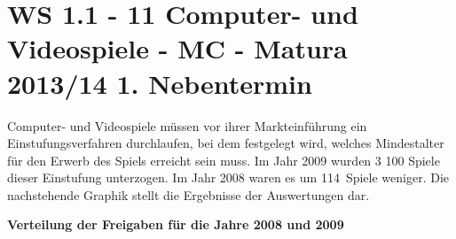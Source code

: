 \section{WS 1.1 - 11 Computer- und Videospiele - MC - Matura 2013/14 1. Nebentermin}

\begin{beispiel}[WS 1.1]{1} %
				Computer- und Videospiele müssen vor ihrer Markteinführung ein Einstufungsverfahren durchlaufen, bei dem festgelegt wird, welches Mindestalter für den Erwerb des Spiels erreicht sein muss. Im Jahr 2009 wurden 3 100 Spiele dieser Einstufung unterzogen. Im Jahr 2008 waren es um 114 Spiele weniger. Die nachstehende Graphik stellt die Ergebnisse der Auswertungen dar.
				
				\begin{center}
					\textbf{Verteilung der Freigaben für die Jahre 2008 und 2009}
					

\end{center}
\end{beispiel}
